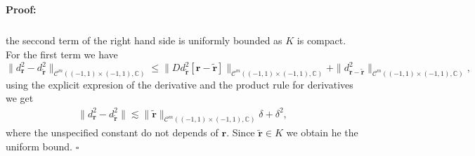 \documentclass{article}
\newenvironment{proof}{\paragraph{Proof:}}{\hfill$\square$}
\newcommand{\IC}{{\mathbb C}}
\newcommand{\cmspace}[3]{\mathcal{C}^{#1} \left( #2, #3 \right)}
\newcommand{\br}{\bm{r}}
\newcommand{\iinterv}{(-1,1)\times(-1,1)}
\begin{document}
\begin{proof}
\begin{align*}
\end{align*}
the seccond term of the right hand side is uniformly bounded as $K$ is compact. For the first term we have
$$\| d^2_{\br}  - d_{\widetilde{\br}}^2 \|_{\cmspace{m}{\iinterv}{\IC}} \leq 
\|D d^2_{\widetilde{\br}}[\br - \widetilde{\br}]\|_{\cmspace{m}{\iinterv}{\IC}} + \| d^2_{\br -\widetilde{\br}}\|_{\cmspace{m}{\iinterv}{\IC}},$$
 using the explicit expresion of the derivative and the product rule for derivatives we get
\begin{align*}
\| d^2_{\br}  - d_{\widetilde{\br}}^2 \| \lesssim 
\|\widetilde{\br}\|_{\cmspace{m}{\iinterv}{\IC}} \delta  + \delta^2,
\end{align*}
where the unspecified constant do not depends of $\br$. Since $\widetilde{\br} \in K$ we obtain he the uniform bound. 
\end{proof}
\end{document}
